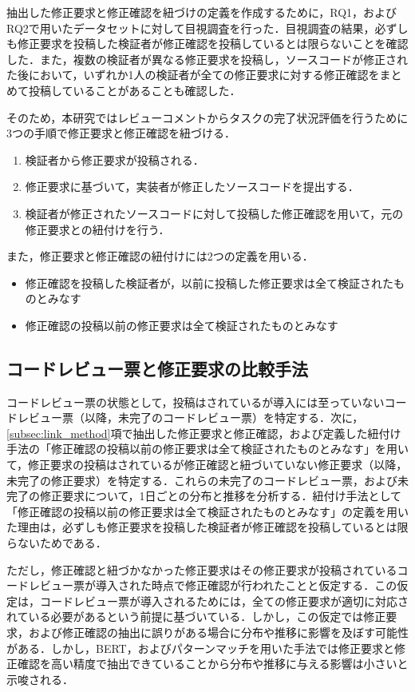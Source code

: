 \documentclass[11pt]{jreport}
\begin{document}
抽出した修正要求と修正確認を紐づけの定義を作成するために，RQ1，およびRQ2で用いたデータセットに対して目視調査を行った．目視調査の結果，必ずしも修正要求を投稿した検証者が修正確認を投稿しているとは限らないことを確認した．また，複数の検証者が異なる修正要求を投稿し，ソースコードが修正された後において，いずれか1人の検証者が全ての修正要求に対する修正確認をまとめて投稿していることがあることも確認した．

そのため，本研究ではレビューコメントからタスクの完了状況評価を行うために3つの手順で修正要求と修正確認を紐づける．

\begin{enumerate}[label=\textbf{手順\arabic*:}, leftmargin=50pt]
\item 検証者から修正要求が投稿される．
\item 修正要求に基づいて，実装者が修正したソースコードを提出する．
\item 検証者が修正されたソースコードに対して投稿した修正確認を用いて，元の修正要求との紐付けを行う．
\end{enumerate}

また，修正要求と修正確認の紐付けには2つの定義を用いる．

\begin{itemize}
\item 修正確認を投稿した検証者が，以前に投稿した修正要求は全て検証されたものとみなす
\item 修正確認の投稿以前の修正要求は全て検証されたものとみなす
\end{itemize}

\subsection{コードレビュー票と修正要求の比較手法}
コードレビュー票の状態として，投稿はされているが導入には至っていないコードレビュー票（以降，未完了のコードレビュー票）を特定する．次に，\ref{subsec:link_method}項で抽出した修正要求と修正確認，および定義した紐付け手法の「修正確認の投稿以前の修正要求は全て検証されたものとみなす」を用いて，修正要求の投稿はされているが修正確認と紐づいていない修正要求（以降，未完了の修正要求）を特定する．これらの未完了のコードレビュー票，および未完了の修正要求について，1日ごとの分布と推移を分析する．紐付け手法として「修正確認の投稿以前の修正要求は全て検証されたものとみなす」の定義を用いた理由は，必ずしも修正要求を投稿した検証者が修正確認を投稿しているとは限らないためである．

ただし，修正確認と紐づかなかった修正要求はその修正要求が投稿されているコードレビュー票が導入された時点で修正確認が行われたことと仮定する．この仮定は，コードレビュー票が導入されるためには，全ての修正要求が適切に対応されている必要があるという前提に基づいている．しかし，この仮定では修正要求，および修正確認の抽出に誤りがある場合に分布や推移に影響を及ぼす可能性がある．しかし，BERT，およびパターンマッチを用いた手法では修正要求と修正確認を高い精度で抽出できていることから分布や推移に与える影響は小さいと示唆される．
\end{document}
